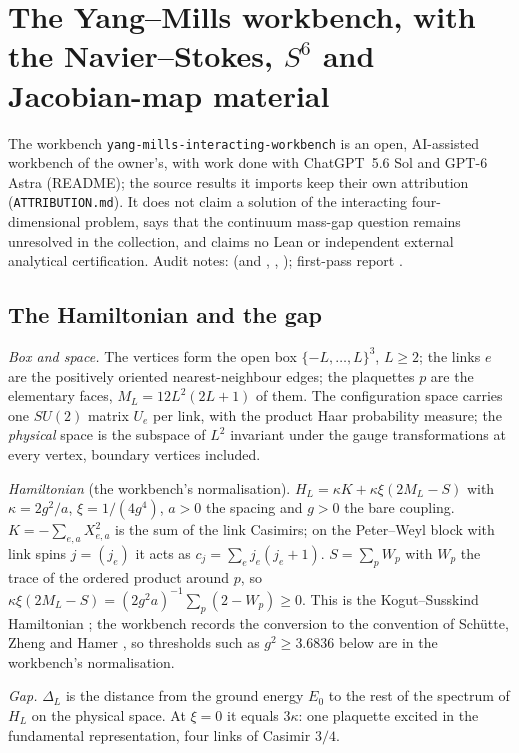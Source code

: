 \section{The Yang--Mills workbench, with the Navier--Stokes, \texorpdfstring{$S^6$}{S6} and Jacobian-map material}\label{sec:ym}

The workbench \texttt{yang-mills-interacting-workbench} is an open, AI-assisted workbench of the owner's, with work done with ChatGPT~5.6 Sol and GPT-6 Astra (README); the source results it imports keep their own attribution (\texttt{ATTRIBUTION.md}). It does not claim a solution of the interacting four-dimensional problem, says that the continuum mass-gap question remains unresolved in the collection, and claims no Lean or independent external analytical certification.
Audit notes:  (and , , ); first-pass report .

\subsection{The Hamiltonian and the gap}

\emph{Box and space.} The vertices form the open box $\{-L,\dots,L\}^3$, $L\ge2$; the links $e$ are the positively oriented nearest-neighbour edges; the plaquettes $p$ are the elementary faces, $M_L=12L^2(2L+1)$ of them. The configuration space carries one $SU(2)$ matrix $U_e$ per link, with the product Haar probability measure; the \emph{physical} space is the subspace of $L^2$ invariant under the gauge transformations at every vertex, boundary vertices included.

\emph{Hamiltonian} (the workbench's normalisation). $H_L=\kappa K+\kappa\xi(2M_L-S)$ with $\kappa=2g^2/a$, $\xi=1/(4g^4)$, $a>0$ the spacing and $g>0$ the bare coupling. $K=-\sum_{e,a}X_{e,a}^2$ is the sum of the link Casimirs; on the Peter--Weyl block with link spins $j=(j_e)$ it acts as $c_j=\sum_ej_e(j_e+1)$. $S=\sum_pW_p$ with $W_p$ the trace of the ordered product around $p$, so $\kappa\xi(2M_L-S)=(2g^2a)^{-1}\sum_p(2-W_p)\ge0$. This is the Kogut--Susskind Hamiltonian \cite{KogutSusskind}; the workbench records the conversion to the convention of Schütte, Zheng and Hamer \cite{SchutteZhengHamer}, so thresholds such as $g^2\ge3.6836$ below are in the workbench's normalisation.

\emph{Gap.} $\Delta_L$ is the distance from the ground energy $E_0$ to the rest of the spectrum of $H_L$ on the physical space. At $\xi=0$ it equals $3\kappa$: one plaquette excited in the fundamental representation, four links of Casimir $3/4$.

